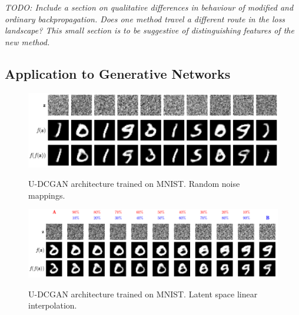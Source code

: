 \documentclass{article}
\theoremstyle{plain}
\theoremstyle{definition}
\theoremstyle{remark}
\begin{document}
\textit{TODO: Include a section on qualitative differences in behaviour of modified and ordinary backpropagation. Does one method travel a different route in the loss landscape? This small section is to be suggestive of distinguishing features of the new method.}

\subsection{Application to Generative Networks}

\begin{figure}[htbp]
    \centering
    \includegraphics[width=\textwidth]{./resources/modified_0-1_0-1_rand_noise_mapping.png}
    \label{fig:gen-mnist}
    \caption{U-DCGAN architecture trained on MNIST. Random noise mappings.}
\end{figure}


\begin{figure}[htbp]
    \centering
    \includegraphics[width=\textwidth]{./resources/modified_0-1_0-1_rand_latent_space.png}
    \label{fig:latent-mnist}
    \caption{U-DCGAN architecture trained on MNIST. Latent space linear interpolation.}
\end{figure}

\end{document}
